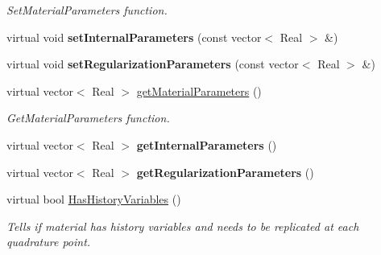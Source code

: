 \begin{DoxyCompactItemize}
\begin{DoxyCompactList}\small\item\em SetMaterialParameters function. \item\end{DoxyCompactList}\item 
\hypertarget{classvoom_1_1_plastic_material_a471448c87a4c9014a26a66bf8973fe1c}{
virtual void {\bfseries setInternalParameters} (const vector$<$ Real $>$ \&)}
\label{classvoom_1_1_plastic_material_a471448c87a4c9014a26a66bf8973fe1c}

\item 
\hypertarget{classvoom_1_1_plastic_material_a9e01ac94dbe93ec528d23cf394f4114d}{
virtual void {\bfseries setRegularizationParameters} (const vector$<$ Real $>$ \&)}
\label{classvoom_1_1_plastic_material_a9e01ac94dbe93ec528d23cf394f4114d}

\item 
\hypertarget{classvoom_1_1_plastic_material_a973a04a611a169326e14c10e0f8c9012}{
virtual vector$<$ Real $>$ \hyperlink{classvoom_1_1_plastic_material_a973a04a611a169326e14c10e0f8c9012}{getMaterialParameters} ()}
\label{classvoom_1_1_plastic_material_a973a04a611a169326e14c10e0f8c9012}

\begin{DoxyCompactList}\small\item\em GetMaterialParameters function. \item\end{DoxyCompactList}\item 
\hypertarget{classvoom_1_1_plastic_material_aa2b26fddc29c31872d6f6d1780ec1d86}{
virtual vector$<$ Real $>$ {\bfseries getInternalParameters} ()}
\label{classvoom_1_1_plastic_material_aa2b26fddc29c31872d6f6d1780ec1d86}

\item 
\hypertarget{classvoom_1_1_plastic_material_a3222f480e3b5eac25befc29043d9c726}{
virtual vector$<$ Real $>$ {\bfseries getRegularizationParameters} ()}
\label{classvoom_1_1_plastic_material_a3222f480e3b5eac25befc29043d9c726}

\item 
\hypertarget{classvoom_1_1_plastic_material_a3a310aaf70a477f76dc39fc741183321}{
virtual bool \hyperlink{classvoom_1_1_plastic_material_a3a310aaf70a477f76dc39fc741183321}{HasHistoryVariables} ()}
\label{classvoom_1_1_plastic_material_a3a310aaf70a477f76dc39fc741183321}

\begin{DoxyCompactList}\small\item\em Tells if material has history variables and needs to be replicated at each quadrature point. \item\end{DoxyCompactList}\end{DoxyCompactItemize}
